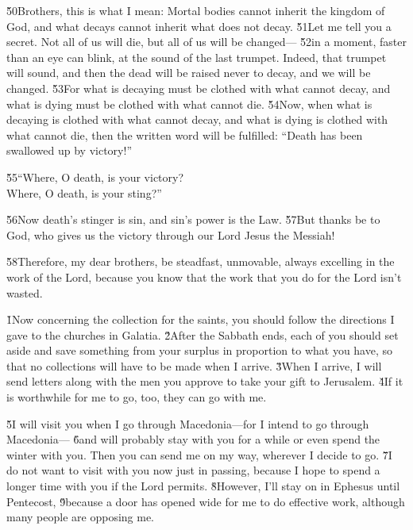 \v{50}Brothers, this is what I mean: Mortal bodies cannot inherit the kingdom of God, and what decays cannot inherit what does not decay. \v{51}Let me tell you a secret. Not all of us will die, but all of us will be changed--- \v{52}in a moment, faster than an eye can blink, at the sound of the last trumpet. Indeed, that trumpet will sound, and then the dead will be raised never to decay, and we will be changed. \v{53}For what is decaying must be clothed with what cannot decay, and what is dying must be clothed with what cannot die. \v{54}Now, when what is decaying is clothed with what cannot decay, and what is dying is clothed with what cannot die, then the written word will be fulfilled: ``Death has been swallowed up by victory!''

\begin{poetry}
\poeml \v{55}``Where, O death, is your victory? \\
\poemll    Where, O death, is your sting?''
\end{poetry}

\v{56}Now death's stinger is sin, and sin's power is the Law. \v{57}But thanks be to God, who gives us the victory through our Lord Jesus the Messiah!

\v{58}Therefore, my dear brothers, be steadfast, unmovable, always excelling in the work of the Lord, because you know that the work that you do for the Lord isn't wasted.

\v{1}Now concerning the collection for the saints, you should follow the directions I gave to the churches in Galatia. \v{2}After the Sabbath ends, each of you should set aside and save something from your surplus in proportion to what you have, so that no collections will have to be made when I arrive. \v{3}When I arrive, I will send letters along with the men you approve to take your gift to Jerusalem. \v{4}If it is worthwhile for me to go, too, they can go with me.

\v{5}I will visit you when I go through Macedonia---for I intend to go through Macedonia--- \v{6}and will probably stay with you for a while or even spend the winter with you. Then you can send me on my way, wherever I decide to go. \v{7}I do not want to visit with you now just in passing, because I hope to spend a longer time with you if the Lord permits. \v{8}However, I'll stay on in Ephesus until Pentecost, \v{9}because a door has opened wide for me to do effective work, although many people are opposing me.

